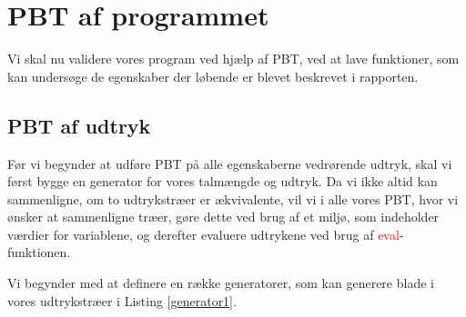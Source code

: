 \section{PBT af programmet}
Vi skal nu validere vores program ved hjælp af PBT, ved at lave funktioner, som kan undersøge de egenskaber der løbende er blevet beskrevet i rapporten. 

\subsection{PBT af udtryk}
Før vi begynder at udføre PBT på alle egenskaberne vedrørende udtryk, skal vi først bygge en generator for vores talmængde og udtryk. Da vi ikke altid kan sammenligne, om to udtrykstræer er ækvivalente, vil vi i alle vores PBT, hvor vi ønsker at sammenligne træer, gøre dette ved brug af et miljø, som indeholder værdier for variablene, og derefter evaluere udtrykene ved brug af \textcolor{red}{eval}-funktionen.

Vi begynder med at definere en række generatorer, som kan generere blade i vores udtrykstræer i Listing \ref{generator1}.


